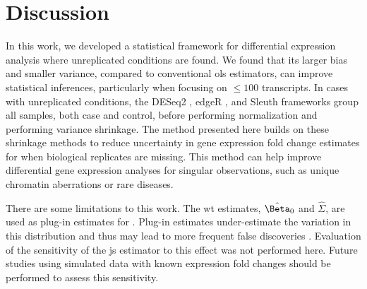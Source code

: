 \section{Discussion}

In this work, we developed a statistical framework for differential expression analysis where unreplicated conditions are found.
We found that its larger bias and smaller variance, compared to conventional \gls{ols} estimators, can improve statistical inferences, particularly when focusing on $\le 100$ transcripts.
In cases with unreplicated conditions, the DESeq2 \cite{loveModeratedEstimationFold2014}, edgeR \cite{robinsonEdgeRBioconductorPackage2010}, and Sleuth \cite{pimentelDifferentialAnalysisRNAseq2017,yiGenelevelDifferentialAnalysis2018} frameworks group all samples, both case and control, before performing normalization and performing variance shrinkage.
The method presented here builds on these shrinkage methods to reduce uncertainty in gene expression fold change estimates for when biological replicates are missing.
This method can help improve differential gene expression analyses for singular observations, such as unique chromatin aberrations or rare diseases.

There are some limitations to this work.
The \gls{wt} estimates, $\hat{\Beta}_0$ and $\hat{\Sigma}$, are used as plug-in estimates for .
Plug-in estimates under-estimate the variation in this distribution and thus may lead to more frequent false discoveries \cite{efronIntroductionBootstrap1993}.
Evaluation of the sensitivity of the \gls{js} estimator to this effect was not performed here.
Future studies using simulated data with known expression fold changes should be performed to assess this sensitivity.

